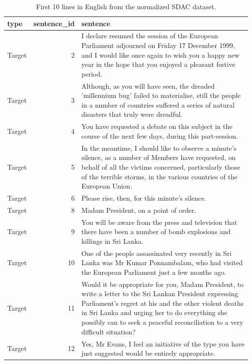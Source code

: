 \documentclass[
  letterpaper,
]{scrbook}
\begin{document}
\hypertarget{tbl-td-europarle-en-preview}{}
\begin{table}
\caption{\label{tbl-td-europarle-en-preview}First 10 lines in English from the normalized SDAC dataset. }\tabularnewline

\centering
\begin{tabular}{lrl}
\toprule
type & sentence\_id & sentence\\
\midrule
Target & 2 & I declare resumed the session of the European Parliament adjourned on Friday 17 December 1999, and I would like once again to wish you a happy new year in the hope that you enjoyed a pleasant festive period.\\
Target & 3 & Although, as you will have seen, the dreaded 'millennium bug' failed to materialise, still the people in a number of countries suffered a series of natural disasters that truly were dreadful.\\
Target & 4 & You have requested a debate on this subject in the course of the next few days, during this part-session.\\
Target & 5 & In the meantime, I should like to observe a minute's silence, as a number of Members have requested, on behalf of all the victims concerned, particularly those of the terrible storms, in the various countries of the European Union.\\
Target & 6 & Please rise, then, for this minute's silence.\\
\addlinespace
Target & 8 & Madam President, on a point of order.\\
Target & 9 & You will be aware from the press and television that there have been a number of bomb explosions and killings in Sri Lanka.\\
Target & 10 & One of the people assassinated very recently in Sri Lanka was Mr Kumar Ponnambalam, who had visited the European Parliament just a few months ago.\\
Target & 11 & Would it be appropriate for you, Madam President, to write a letter to the Sri Lankan President expressing Parliament's regret at his and the other violent deaths in Sri Lanka and urging her to do everything she possibly can to seek a peaceful reconciliation to a very difficult situation?\\
Target & 12 & Yes, Mr Evans, I feel an initiative of the type you have just suggested would be entirely appropriate.\\
\bottomrule
\end{tabular}
\end{table}
\end{document}
